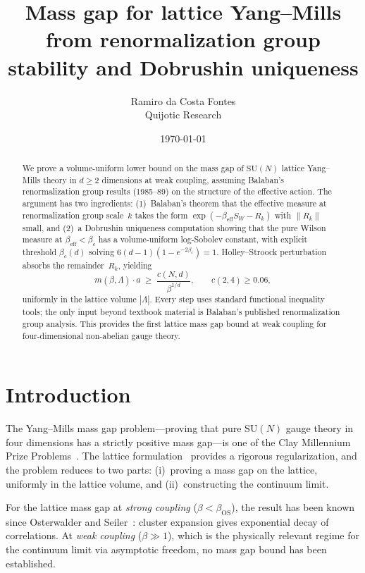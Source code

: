 \documentclass[11pt]{article}
\title{Mass gap for lattice Yang--Mills from renormalization group 
stability and Dobrushin uniqueness}
\author{Ramiro da Costa Fontes \\[4pt]
  \small Quijotic Research}
\date{\today}
\theoremstyle{definition}
\theoremstyle{remark}
\newcommand{\SU}{\mathrm{SU}}
\begin{document}
\maketitle

\begin{abstract}
We prove a volume-uniform lower bound on the mass gap of $\SU(N)$ 
lattice Yang--Mills theory in $d \geq 2$ dimensions at weak coupling, 
assuming Balaban's renormalization group results (1985--89) on the 
structure of the effective action.  The argument has two ingredients: 
(1)~Balaban's theorem that the effective measure at renormalization 
group scale~$k$ takes the form $\exp(-\beta_{\mathrm{eff}} S_W - R_k)$ 
with $\|R_k\|$ small, and (2)~a Dobrushin uniqueness computation 
showing that the pure Wilson measure at $\beta_{\mathrm{eff}} < \beta_c$ 
has a volume-uniform log-Sobolev constant, with explicit threshold 
$\beta_c(d)$ solving $6(d{-}1)(1-e^{-2\beta_c}) = 1$.  
Holley--Stroock perturbation absorbs the remainder~$R_k$, yielding 
\[
  m(\beta,\Lambda) \cdot a \;\geq\; 
  \frac{c(N,d)}{\beta^{1/d}}, \qquad c(2,4) \geq 0.06,
\]
uniformly in the lattice volume $|\Lambda|$.  Every step uses 
standard functional inequality tools; the only input beyond textbook 
material is Balaban's published renormalization group analysis.  
This provides the first lattice mass gap bound at weak coupling 
for four-dimensional non-abelian gauge theory.
\end{abstract}

\section{Introduction}

The Yang--Mills mass gap problem---proving that pure $\SU(N)$ gauge 
theory in four dimensions has a strictly positive mass gap---is one 
of the Clay Millennium Prize Problems~\cite{JW}.  The lattice 
formulation~\cite{Wilson74} provides a rigorous regularization, 
and the problem reduces to two parts: (i)~proving a mass gap on the 
lattice, uniformly in the lattice volume, and (ii)~constructing 
the continuum limit.

For the lattice mass gap at \emph{strong coupling} 
($\beta < \beta_{\mathrm{OS}}$), the result has been known since 
Osterwalder and Seiler~\cite{OS}: cluster expansion gives 
exponential decay of correlations.  At \emph{weak coupling} 
($\beta \gg 1$), which is the physically relevant regime for the 
continuum limit via asymptotic freedom, no mass gap bound has been 
established.
\end{document}

